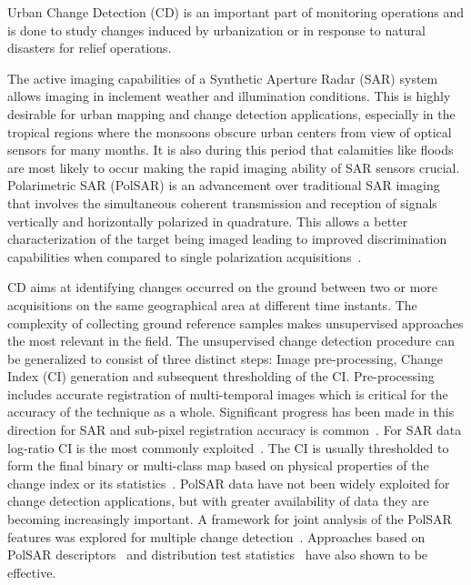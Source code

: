 Urban Change Detection (CD) is an important part of monitoring operations and is done to study changes induced by urbanization or in response to natural disasters for relief operations.

The active imaging capabilities of a Synthetic Aperture Radar (SAR) system allows imaging in inclement weather and illumination conditions. This is highly desirable for urban mapping and change detection applications, especially in the tropical regions where the monsoons obscure urban centers from view of optical sensors for many months. It is also during this period that calamities like floods are most likely to occur making the rapid imaging ability of SAR sensors crucial. Polarimetric SAR (PolSAR) is an advancement over traditional SAR imaging that involves the simultaneous coherent transmission and reception of signals  vertically and horizontally polarized in quadrature. This allows a better characterization of the target being imaged leading to improved discrimination capabilities when compared to single polarization acquisitions~\cite{lee2004classification}. 

CD aims at identifying changes occurred on the ground between two or more acquisitions on the same geographical area at different time instants. The complexity of collecting ground reference samples makes unsupervised approaches the most relevant in the field. The unsupervised change detection procedure can be generalized to consist of three distinct steps: Image pre-processing, Change Index (CI) generation and subsequent thresholding of the CI. Pre-processing includes accurate registration of multi-temporal images which is critical for the accuracy of the technique as a whole. Significant progress has been made in this direction for SAR and sub-pixel registration accuracy is common~\cite{li2008image}. For SAR data log-ratio CI is the most commonly exploited~\cite{bazi2005unsupervised}. The CI is usually thresholded to form the final binary or multi-class map based on physical properties of the change index or its statistics~\cite{bruzzone2000automatic}.
PolSAR data have not been  widely exploited for change detection applications, but with greater availability of data they are becoming increasingly important. A framework for joint analysis of the PolSAR features was explored for multiple change detection~\cite{pirrone2016novel}. Approaches based on PolSAR descriptors~\cite{6310048} and distribution test statistics~\cite{conradsen2003test} have also shown to be effective. 


